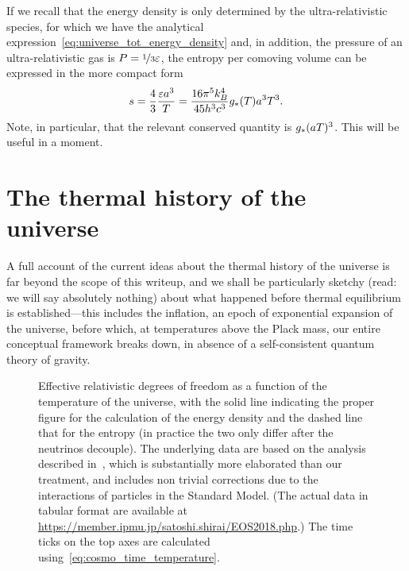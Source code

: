 If we recall that the energy density is only determined by the ultra-relativistic
species, for which we have the analytical expression~\eqref{eq:universe_tot_energy_density}
and, in addition, the pressure of an ultra-relativistic gas is
$P = \nicefrac{1}{3} \varepsilon$, the entropy per comoving volume can
be expressed in the more compact form
\begin{align}
  s = \frac{4}{3} \frac{\varepsilon a^3}{T} =
  \frac{16 \pi^5 k_B^4}{45 h^3 c^3} g_*(T) a^3 T^3.
\end{align}
Note, in particular, that the relevant conserved quantity is $g_* (aT)^3$. This
will be useful in a moment.



\section{The thermal history of the universe}

A full account of the current ideas about the thermal history of the universe is
far beyond the scope of this writeup, and we shall be particularly sketchy
(read: we will say absolutely nothing) about what happened before thermal
equilibrium is established---this includes the inflation, an epoch of exponential
expansion of the universe, before which, at temperatures above the Plack mass, our
entire conceptual framework breaks down, in absence of a self-consistent
quantum theory of gravity.

\begin{figure}[!htbp]
  
  \caption{Effective relativistic degrees of freedom as a function of the temperature
  of the universe, with the solid line indicating the proper figure for the calculation
  of the energy density and the dashed line that for the entropy (in practice the
  two only differ after the neutrinos decouple). The underlying data are based on
  the analysis described in~\cite{2018JCAP...05..035S}, which is substantially more
  elaborated than our treatment, and includes non trivial corrections due to the
  interactions of particles in the Standard Model. (The actual data in tabular format
  are available at \url{https://member.ipmu.jp/satoshi.shirai/EOS2018.php}.)
  The time ticks on the top axes are calculated using~\eqref{eq:cosmo_time_temperature}.}
  \label{fig:cosmo_geff}
\end{figure}

